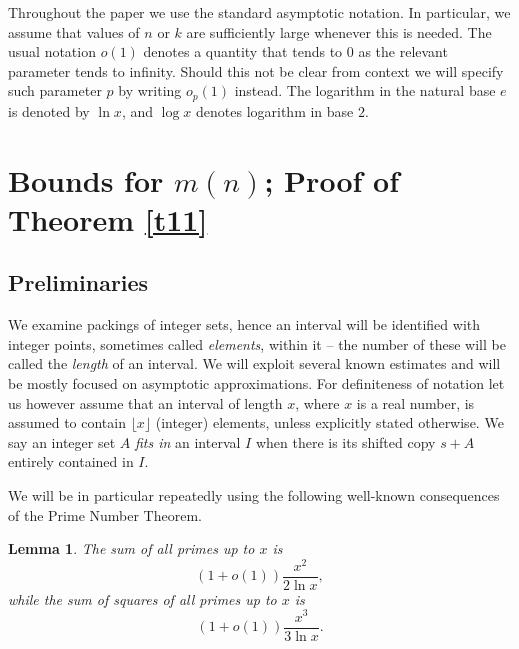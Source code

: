 \documentclass[12pt]{amsart}
\theoremstyle{plain}
\newtheorem{lemma}{Lemma}
\numberwithin{equation}{section}
\begin{document}
Throughout the paper we use the standard asymptotic notation. In particular, we assume that values of $n$ or $k$ are sufficiently large whenever this is needed. The usual notation $o(1)$ denotes a quantity that tends to $0$ as the relevant parameter tends to infinity. 
Should this not be clear from context we will specify such parameter $p$ by writing $o_p(1)$ instead.
The logarithm in the natural base $e$ is denoted by $\ln x$, and $\log x$ denotes logarithm in base $2$.

\section{Bounds for $m(n)$; Proof of Theorem \ref{t11}}
\subsection{Preliminaries}
We examine packings of integer sets, hence an interval will be identified with integer points, sometimes called \emph{elements}, within it -- the number of these will be called the \emph{length} of an interval.
We will exploit several known estimates and will be mostly focused on asymptotic approximations. For definiteness of notation let us however assume that an interval of length $x$, where $x$ is a real number, is assumed to contain $\lfloor x\rfloor$ (integer) elements, unless explicitly stated otherwise. We say an integer set $A$ \emph{fits in} an interval $I$ when there is its shifted copy $s+A$ entirely contained in $I$.

We will be in particular repeatedly using the following well-known consequences of the Prime Number Theorem.
\begin{lemma} \label{l21}
	The sum of all primes up to $x$ is
	$$
	(1+o(1))\frac{x^2}{2 \ln x},
	$$while the sum of squares of all primes up to $x$ is
	$$
	(1+o(1))\frac{x^3}{3 \ln x}.
	$$
\end{lemma}
\end{document}

